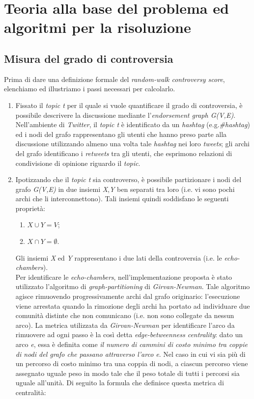 \chapter{Teoria alla base del problema ed algoritmi per la risoluzione}
\label{chap:teoria}
\section{Misura del grado di controversia}
Prima di dare una definizione formale del \textit{random-walk controversy score}, elenchiamo ed illustriamo i passi necessari per calcolarlo.
\begin{enumerate}
\item Fissato il \textit{topic t} per il quale si vuole quantificare il grado di controversia, è possibile descrivere la discussione mediante l'\textit{endorsement graph G(V,E)}. Nell'ambiente di \textit{Twitter}, il \textit{topic t} è identificato da un \textit{hashtag} (e.g.\textit{\#hashtag}) ed i nodi del grafo rappresentano gli utenti che hanno preso parte alla discussione utilizzando almeno una volta tale \textit{hashtag} nei loro \textit{tweets}; gli archi del grafo identificano i \textit{retweets} tra gli utenti, che esprimono relazioni di condivisione di opinione riguardo il \textit{topic}.
\item Ipotizzando che il \textit{topic t} sia controverso, è possibile partizionare i nodi del grafo \textit{G(V,E)} in due insiemi \textit{X},\textit{Y} ben separati tra loro (i.e. vi sono pochi archi che li interconnettono). Tali insiemi quindi soddisfano le seguenti proprietà:
\begin{enumerate}
\item $\textit{X}\cup\textit{Y} = \textit{V}$;
\item $\textit{X}\cap\textit{Y} = \emptyset$.
\end{enumerate}
Gli insiemi \textit{X} ed \textit{Y} rappresentano i due lati della controversia (i.e. le \textit{echo-chambers}).
\\Per identificare le \textit{echo-chambers}, nell'implementazione proposta è stato utilizzato l'algoritmo di \textit{graph-partitioning} di \textit{Girvan-Newman}\cite{girvan:paper}. Tale algoritmo agisce rimuovendo progressivamente archi dal grafo originario: l'esecuzione viene arrestata quando la rimozione degli archi ha portato ad individuare due comunità distinte che non comunicano (i.e. non sono collegate da nessun arco). La metrica utilizzata da \textit{Girvan-Newman} per identificare l'arco da rimuovere ad ogni passo è la così detta \textit{edge-betweenness centrality}: dato un arco \textit{e}, essa è definita come \textit{il numero di cammini di costo minimo tra coppie di nodi del grafo che passano attraverso l'arco e}. Nel caso in cui vi sia più di un percorso di costo minimo tra una coppia di nodi, a ciascun percorso viene assegnato uguale peso in modo tale che il peso totale di tutti i percorsi sia uguale all'unità. Di seguito la formula che definisce questa metrica di centralità:

\end{enumerate}
